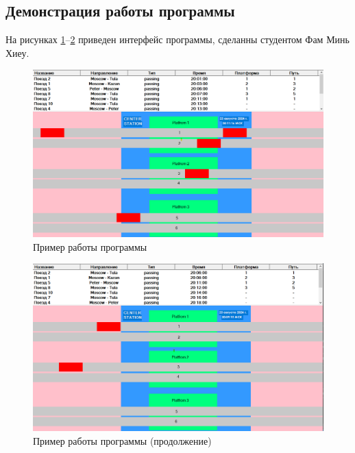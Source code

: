 \subsection{Демонстрация работы программы}

На рисунках \ref{img:demon1}--\ref{img:demon2} приведен интерфейс программы,
сделанны студентом Фам Минь Хиеу.
\begin{figure}[h]
	\centering
	\includegraphics[height=0.35\textheight]{img/examples/demon1.png}
	\caption{Пример работы программы}
	\label{img:demon1}
\end{figure}

\begin{figure}[h]
	\centering
	\includegraphics[height=0.35\textheight]{img/examples/demon2.png}
	\caption{Пример работы программы (продолжение)}
	\label{img:demon2}
\end{figure}
